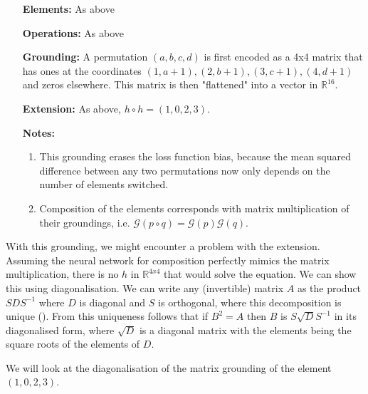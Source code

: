\begin{itemize}
	\item[\textbf{Elements:}] As above
	\item[\textbf{Operations:}] As above
	\item[\textbf{Grounding:}] A permutation $(a,b,c,d)$ is first encoded as a 4x4 matrix that has ones at the coordinates $(1,a+1),(2,b+1),(3,c+1),(4,d+1)$ and zeros elsewhere. This matrix is then "flattened" into a vector in $\mathbb{R}^{16}$.
	\item[\textbf{Extension:}] As above, $h\circ h=(1,0,2,3)$.
	\item[\textbf{Notes:}] 
	\begin{enumerate}

		\item This grounding erases the loss function bias, because the mean squared difference between any two permutations now only depends on the number of elements switched.
	
		\item Composition of the elements corresponds with matrix multiplication of their groundings, i.e. $\mathcal{G}(p\circ q)=\mathcal{G}(p)\mathcal{G}(q)$.	
	\end{enumerate}	
\end{itemize}

With this grounding, we might encounter a problem with the extension. Assuming the neural network for composition perfectly mimics the matrix multiplication, there is no $h$ in $\mathbb{R}^{4x4}$ that would solve the equation. We can show this using diagonalisation. We can write any (invertible) matrix $A$ as the product $SDS^{-1}$ where $D$ is diagonal and $S$ is orthogonal, where this decomposition is unique (\cite{Lingebra}). From this uniqueness follows that if $B^2=A$ then $B$ is $S\sqrt{D}S^{-1}$ in its diagonalised form, where $\sqrt{D}$ is a diagonal matrix with the elements being the square roots of the elements of $D$. 

We will look at the diagonalisation of the matrix grounding of the element $(1,0,2,3)$.

